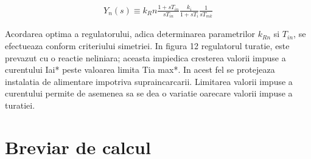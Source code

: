 \documentclass[11pt]{article}
\begin{document}
\begin{align}
Y_n(s)\equiv k_Rn \frac{1+sT_{in}}{sT_{in}} \frac{k_i}{1+sT_i} \frac{1}{sT_{mk}}
\end{align}

Acordarea optima a regulatorului, adica determinarea parametrilor $k_{Rn}$ si $T_{in}$, se efectueaza conform criteriului simetriei. In figura 12 regulatorul turatie, este prevazut cu o reactie neliniara; aceasta impiedica cresterea valorii impuse a curentului Iai* peste valoarea limita Tia max*. In acest fel se protejeaza instalatia de alimentare impotriva supraincarcarii. 
Limitarea valorii impuse a curentului permite de asemenea sa se dea o variatie oarecare valorii impuse a turatiei.

\newpage
\section{Breviar de calcul}
\newpage
\nocite{*}


\end{document}
